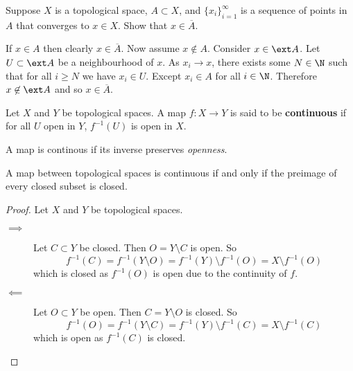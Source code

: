 \begin{problem}
	Suppose $X$ is a topological space, $A \subset X$, and $\{x_i\}_{i=1}^\infty$
	is a sequence of points in $A$ that converges to $x \in X$.
	Show that $x \in \overline A$.
\end{problem}

\begin{solution}
	If $x \in A$ then clearly $x \in \overline A$. Now assume $x \not\in A$.
	Consider $x \in \ext A$. Let $U \subset \ext A$ be a neighbourhood of
	$x$. As $x_i \to x$, there exists some $N \in \N$ such that for all 
	$i \geq N$ we have $x_i \in U$. Except $x_i \in A$ for all $i \in \N$.
	Therefore $x \not\in \ext A$ and so $x \in \overline A$.
\end{solution}

\begin{definition}[Continuity]
	Let $X$ and $Y$ be topological spaces.
	A map $f: X \to Y$ is said to be \textbf{continuous} if for all $U$ open in 
	$Y$, $f^{-1}(U)$ is open in $X$.
\end{definition}

\begin{remark}
	A map is continous if its inverse preserves \emph{openness}.
\end{remark}

\begin{proposition}[]
	A map between topological spaces is continuous if and only if the preimage
	of every closed subset is closed.
\end{proposition}

\begin{proof}
	Let $X$ and $Y$ be topological spaces.
	\begin{description}
		\item[$\implies$] 
			Let $C \subset Y$ be closed.
			Then $O = Y \setminus C$ is open.
			So \[
				f^{-1}(C) 
				= f^{-1}(Y \setminus O) 
				= f^{-1}(Y) \setminus f^{-1}(O)
				= X \setminus f^{-1}(O)
			\]
			which is closed as $f^{-1}(O)$ is open due to the continuity of $f$.

		\item[$\impliedby$]
			Let $O \subset Y$ be open.
			Then $C = Y \setminus O$ is closed.
			So \[
				f^{-1}(O)
				= f^{-1}(Y \setminus C)
				= f^{-1}(Y) \setminus f^{-1}(C)
				= X \setminus f^{-1}(C)
			\]
			which is open as $f^{-1}(C)$ is closed.
	\end{description}
\end{proof}

